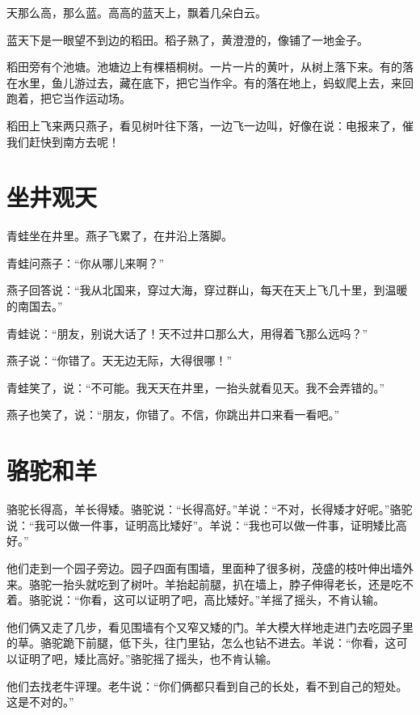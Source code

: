\documentclass[12pt,UTF-8,openany]{ctexbook}
\begin{document}
\begin{Large}
    
    天那么高，那么蓝。高高的蓝天上，飘着几朵白云。
    
    蓝天下是一眼望不到边的稻田。稻子熟了，黄澄澄的，像铺了一地金子。
    
    稻田旁有个池塘。池塘边上有棵梧桐树。一片一片的黄叶，从树上落下来。有的落在水里，鱼儿游过去，藏在底下，把它当作伞。有的落在地上，蚂蚁爬上去，来回跑着，把它当作运动场。
    
    稻田上飞来两只燕子，看见树叶往下落，一边飞一边叫，好像在说：电报来了，催我们赶快到南方去呢！
    
\end{Large}

\chapter{坐井观天}

\begin{Large}
    
    青蛙坐在井里。燕子飞累了，在井沿上落脚。
    
    青蛙问燕子：“你从哪儿来啊？”
    
    燕子回答说：“我从北国来，穿过大海，穿过群山，每天在天上飞几十里，到温暖的南国去。”
    
    青蛙说：“朋友，别说大话了！天不过井口那么大，用得着飞那么远吗？”
    
    燕子说：“你错了。天无边无际，大得很哪！”
    
    青蛙笑了，说：“不可能。我天天在井里，一抬头就看见天。我不会弄错的。”
    
    燕子也笑了，说：“朋友，你错了。不信，你跳出井口来看一看吧。”
    
\end{Large}

\chapter{骆驼和羊}

\begin{Large}
    
    骆驼长得高，羊长得矮。骆驼说：“长得高好。”羊说：“不对，长得矮才好呢。”骆驼说：“我可以做一件事，证明高比矮好”。羊说：“我也可以做一件事，证明矮比高好。”
    
    他们走到一个园子旁边。园子四面有围墙，里面种了很多树，茂盛的枝叶伸出墙外来。骆驼一抬头就吃到了树叶。羊抬起前腿，扒在墙上，脖子伸得老长，还是吃不着。骆驼说：“你看，这可以证明了吧，高比矮好。”羊摇了摇头，不肯认输。
    
    他们俩又走了几步，看见围墙有个又窄又矮的门。羊大模大样地走进门去吃园子里的草。骆驼跪下前腿，低下头，往门里钻，怎么也钻不进去。羊说：“你看，这可以证明了吧，矮比高好。”骆驼摇了摇头，也不肯认输。
    
    他们去找老牛评理。老牛说：“你们俩都只看到自己的长处，看不到自己的短处。这是不对的。”
    
\end{Large}
\end{document}
